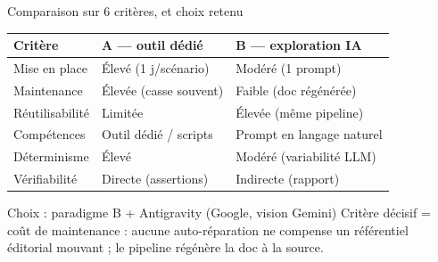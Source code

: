 \begin{frame}{Comparaison sur 6 critères, et choix retenu}
  \scriptsize
  \begin{table}
    \begin{tabular}{lll}
      \toprule
      \textbf{Critère} & \textbf{A --- outil dédié} & \textbf{B --- exploration IA} \\
      \midrule
      Mise en place      & Élevé (1 j/scénario)        & Modéré (1 prompt) \\
      Maintenance        & Élevée (casse souvent)      & \alert{Faible (doc régénérée)} \\
      Réutilisabilité    & Limitée                     & \alert{Élevée (même pipeline)} \\
      Compétences        & Outil dédié / scripts       & Prompt en langage naturel \\
      Déterminisme       & \alert{Élevé}               & Modéré (variabilité LLM) \\
      Vérifiabilité      & Directe (assertions)        & Indirecte (rapport) \\
      \bottomrule
    \end{tabular}
  \end{table}
  \vskip 4pt
  \begin{block}{Choix : paradigme B + Antigravity (Google, vision Gemini)}
    \footnotesize Critère décisif = \alert{coût de maintenance} : aucune auto-réparation ne compense un
    référentiel éditorial mouvant ; le pipeline régénère la doc à la source.
  \end{block}
\end{frame}

